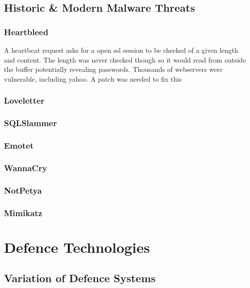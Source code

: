 
\section{Historic \& Modern Malware Threats}
\subsection{Heartbleed}
A heartbeat request asks for a open ssl session to be checked of a given length and content. The length was never checked though so it would read from outside the buffer potentially revealing passwords. Thousands of webservers were vulnerable, including yahoo. A patch was needed to fix this

\subsection{Loveletter}

\subsection{SQLSlammer}

\subsection{Emotet}

\subsection{WannaCry}

\subsection{NotPetya}

\subsection{Mimikatz}



\chapter{Defence Technologies}
\section{Variation of Defence Systems}
